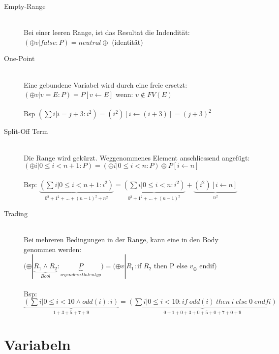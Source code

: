 \documentclass[a4paper,10pt]{article}
\newcommand{\la}{\leftarrow}
\begin{document}
\begin{description}
	\item[Empty-Range] \hfill \\
		Bei einer leeren Range, ist das Resultat die Indendit\"at: \\
		 $(\oplus v | false : P) = neutral\oplus$ (identit\"at)
	\item[One-Point] \hfill \\
		Eine gebundene Variabel wird durch eine freie ersetzt: \\
		$(\oplus v | v=E : P) = P[v \la E]$ wenn: $v  \notin FV(E)$ \\ \\
		Bsp $(\sum i | i = j + 3 :i^2)=(i^2)[i \la (i+3)]=(j+3)^2$
	\item [Split-Off Term] \hfill \\
		Die Range wird gek\"urzt. Weggenommenes Element anschliessend angef\"ugt: \\
		$(\oplus i | 0 \leq i < n+1:P)=(\oplus i | 0 \leq i < n : P) \oplus P[i \la n]$ \\ \\
		Bsp: $\underbrace{(\sum i | 0 \leq i < n+1:i^2)}_{0^2+1^2+...+(n-1)^2+n^2} = \underbrace{(\sum i | 0 \leq i < n : i^2)}_{0^2+1^2+...+(n-1)^2} + \underbrace{(i^2)[i \la n]}_{n^2}$
	\item[Trading] \hfill \\
		Bei mehreren Bedingungen in der Range, kann eine in den Body genommen werden: \\
		$(\oplus | \underbrace{R_1 \wedge R_2}_{Bool}:\underbrace{P}_{irgendein Datentyp}) = (\oplus v | R_1:$if $R_2$ then P else $v_{\oplus}$ endif$)$ \\ \\
		Bsp: $\underbrace{(\sum i | 0 \leq  i < 10 \wedge odd(i) : i )}_{1+3+5+7+9} = \underbrace{(\sum i | 0 \leq i < 10 :  if \hspace{3pt} odd(i) \hspace{3pt} then \hspace{3pt} i \hspace{3pt} else \hspace{3pt} 0 \hspace{3pt} endfi)}_{0+1+0+3+0+5+0+7+0+9}$
\end{description}

\newpage
\section{Variabeln}
\end{document}

